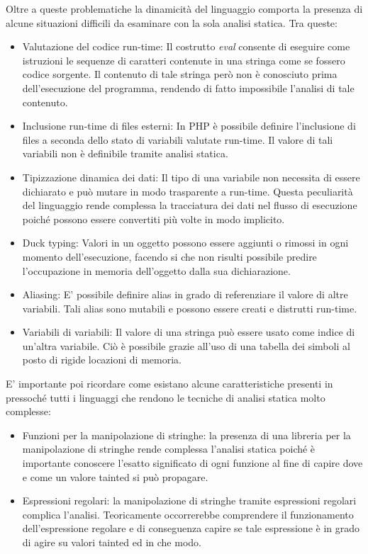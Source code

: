 Oltre a queste problematiche la dinamicità del linguaggio comporta la presenza di alcune situazioni difficili da esaminare con la sola analisi statica. Tra queste:
\begin{itemize}
\item Valutazione del codice run-time: Il costrutto \emph{eval} consente di eseguire come istruzioni le sequenze di caratteri contenute in una stringa come se fossero codice sorgente. Il contenuto di tale stringa però non è conosciuto prima dell'esecuzione del programma, rendendo di fatto impossibile l'analisi di tale contenuto.
\item Inclusione run-time di files esterni: In PHP è possibile definire l'inclusione di files a seconda dello stato di variabili valutate run-time. Il valore di tali variabili non è definibile tramite analisi statica.
\item Tipizzazione dinamica dei dati: Il tipo di una variabile non necessita di essere dichiarato e può mutare in modo trasparente a run-time. Questa peculiarità del linguaggio rende complessa la tracciatura dei dati nel flusso di esecuzione poiché possono essere convertiti più volte in modo implicito.
\item Duck typing: Valori in un oggetto possono essere aggiunti o rimossi in ogni momento dell'esecuzione, facendo si che non risulti possibile predire l'occupazione in memoria dell'oggetto dalla sua dichiarazione.
\item Aliasing: E' possibile definire alias in grado di referenziare il valore di altre variabili. Tali alias sono mutabili e possono essere creati e distrutti run-time.
\item Variabili di variabili: Il valore di una stringa può essere usato come indice di un'altra variabile. Ciò è possibile grazie all'uso di una tabella dei simboli al posto di rigide locazioni di memoria.
\end{itemize}

E' importante poi ricordare come esistano alcune caratteristiche presenti in pressoché tutti i linguaggi che rendono le tecniche di analisi statica molto complesse: 
\begin{itemize}
\item Funzioni per la manipolazione di stringhe: la presenza di una libreria per la manipolazione di stringhe rende complessa l'analisi statica poiché è importante conoscere l'esatto significato di ogni funzione al fine di capire dove e come un valore tainted si può propagare.
\item Espressioni regolari: la manipolazione di stringhe tramite espressioni regolari complica l'analisi. Teoricamente occorrerebbe comprendere il funzionamento dell'espressione regolare e di conseguenza capire se tale espressione è in grado di agire su valori tainted ed in che modo.
\end{itemize}

